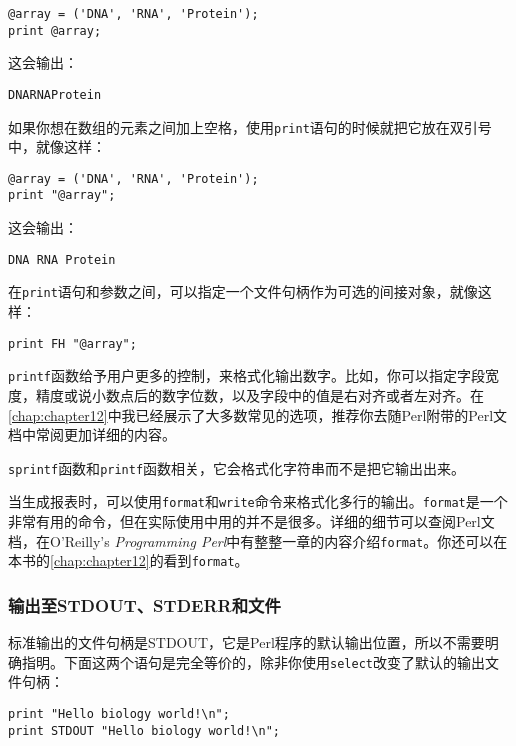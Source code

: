 \begin{lstlisting}
@array = ('DNA', 'RNA', 'Protein');
print @array;
\end{lstlisting}

这会输出：

\begin{lstlisting}
DNARNAProtein
\end{lstlisting}

如果你想在数组的元素之间加上空格，使用\verb|print|语句的时候就把它放在双引号中，就像这样：

\begin{lstlisting}
@array = ('DNA', 'RNA', 'Protein');
print "@array";
\end{lstlisting}

这会输出：

\begin{lstlisting}
DNA RNA Protein
\end{lstlisting}

在\verb|print|语句和参数之间，可以指定一个文件句柄作为可选的间接对象，就像这样：

\begin{lstlisting}
print FH "@array";
\end{lstlisting}

\verb|printf|函数给予用户更多的控制，来格式化输出数字。比如，你可以指定字段宽度，精度或说小数点后的数字位数，以及字段中的值是右对齐或者左对齐。在\autoref{chap:chapter12}中我已经展示了大多数常见的选项，推荐你去随Perl附带的Perl文档中常阅更加详细的内容。

\verb|sprintf|函数和\verb|printf|函数相关，它会格式化字符串而不是把它输出出来。

当生成报表时，可以使用\verb|format|和\verb|write|命令来格式化多行的输出。\verb|format|是一个非常有用的命令，但在实际使用中用的并不是很多。详细的细节可以查阅Perl文档，在O'Reilly's \textit{Programming Perl}中有整整一章的内容介绍\verb|format|。你还可以在本书的\autoref{chap:chapter12}的看到\verb|format|。

\subsubsection{输出至STDOUT、STDERR和文件}
标准输出的文件句柄是STDOUT，它是Perl程序的默认输出位置，所以不需要明确指明。下面这两个语句是完全等价的，除非你使用\verb|select|改变了默认的输出文件句柄：

\begin{lstlisting}
print "Hello biology world!\n";
print STDOUT "Hello biology world!\n";
\end{lstlisting}

